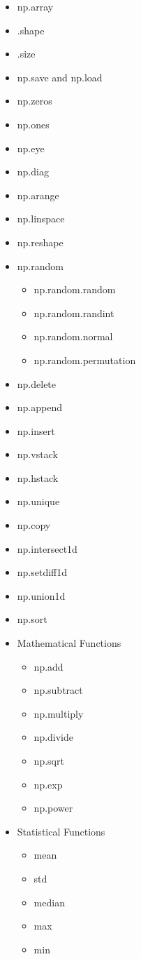 \documentclass{article}
\begin{document}
	\begin{itemize}
		\item np.array
		\item .shape
		\item .size
		\item np.save and np.load
		\item np.zeros
		\item np.ones
		\item np.eye
		\item np.diag
		\item np.arange
		\item np.linspace
		\item np.reshape
		\item np.random
			\begin{itemize}
				\item np.random.random
				\item np.random.randint
				\item np.random.normal
				\item np.random.permutation
			\end{itemize}
		\item np.delete
		\item np.append
		\item np.insert
		\item np.vstack
		\item np.hstack
		\item np.unique
		\item np.copy
		\item np.intersect1d
		\item np.setdiff1d
		\item np.union1d
		\item np.sort
		\item Mathematical Functions
		\begin{itemize}
			\item np.add
			\item np.subtract
			\item np.multiply
			\item np.divide
			\item np.sqrt
			\item np.exp
			\item np.power 
		\end{itemize}
		\item Statistical Functions
		\begin{itemize}
			\item mean
			\item std
			\item median
			\item max
			\item min
		\end{itemize}
	\end{itemize}
\end{document}
